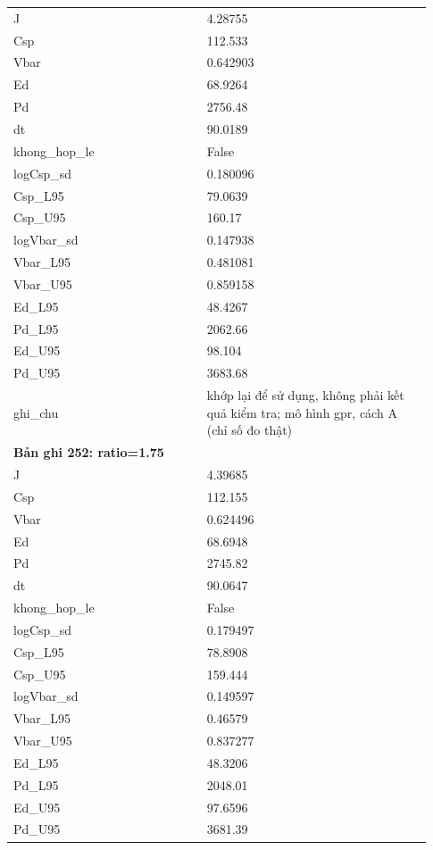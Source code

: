 \begin{longtable}{p{0.43\linewidth}p{0.50\linewidth}}
J & 4.28755 \\
Csp & 112.533 \\
Vbar & 0.642903 \\
Ed & 68.9264 \\
Pd & 2756.48 \\
dt & 90.0189 \\
khong\_\allowbreak hop\_\allowbreak le & False \\
logCsp\_\allowbreak sd & 0.180096 \\
Csp\_\allowbreak L95 & 79.0639 \\
Csp\_\allowbreak U95 & 160.17 \\
logVbar\_\allowbreak sd & 0.147938 \\
Vbar\_\allowbreak L95 & 0.481081 \\
Vbar\_\allowbreak U95 & 0.859158 \\
Ed\_\allowbreak L95 & 48.4267 \\
Pd\_\allowbreak L95 & 2062.66 \\
Ed\_\allowbreak U95 & 98.104 \\
Pd\_\allowbreak U95 & 3683.68 \\
ghi\_\allowbreak chu & khớp lại để sử dụng, không phải kết quả kiểm tra; mô hình gpr, cách A (chỉ số đo thật) \\
\midrule
\multicolumn{2}{p{0.95\linewidth}}{\textbf{Bản ghi 252: ratio=1.75}} \\
J & 4.39685 \\
Csp & 112.155 \\
Vbar & 0.624496 \\
Ed & 68.6948 \\
Pd & 2745.82 \\
dt & 90.0647 \\
khong\_\allowbreak hop\_\allowbreak le & False \\
logCsp\_\allowbreak sd & 0.179497 \\
Csp\_\allowbreak L95 & 78.8908 \\
Csp\_\allowbreak U95 & 159.444 \\
logVbar\_\allowbreak sd & 0.149597 \\
Vbar\_\allowbreak L95 & 0.46579 \\
Vbar\_\allowbreak U95 & 0.837277 \\
Ed\_\allowbreak L95 & 48.3206 \\
Pd\_\allowbreak L95 & 2048.01 \\
Ed\_\allowbreak U95 & 97.6596 \\
Pd\_\allowbreak U95 & 3681.39 \\

\end{longtable}
